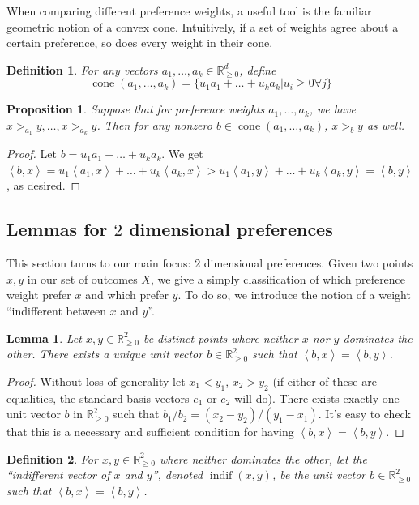 \documentclass[12pt]{article}
\newtheorem*{definition}{Definition}
\newtheorem{proposition}[theorem]{Proposition}
\newtheorem{lemma}[theorem]{Lemma}
\newcommand{\Rgz}{\mathbb{R}_{\ge 0}}
\newcommand{\ip}[2]{\left\langle{#1},{#2}\right\rangle}
\DeclareMathOperator*{\cone}{cone}
\DeclareMathOperator*{\indif}{indif}
\newcommand{\1}[1]{\mathds{1}[{#1}]}
\begin{document}

    When comparing different preference weights, a useful tool is
    the familiar geometric notion of a convex cone.
    Intuitively, if a set of weights agree about a certain preference,
    so does every weight in their cone.
    \begin{definition}
      For any vectors $a_1,\ldots, a_k \in \Rgz^d$, define
      \[ \cone(a_1,\ldots,a_k) = \{ u_1a_1 + \ldots + u_ka_k | u_i\ge 0 \forall j\} \]
    \end{definition}
    \begin{proposition}\label{prop:conesAgreement}
      Suppose that for preference weights $a_1,\ldots, a_k$,
      we have $x >_{a_1} y, \ldots, x >_{a_k} y$.
      Then for any nonzero $b\in \cone(a_1,\ldots, a_k)$,
      $x >_b y$ as well.
    \end{proposition}
    \begin{proof}
      Let $b = u_1a_1+ \ldots + u_ka_k$.
      We get $\ip{b}{x} = u_1\ip{a_1}{x} + \ldots + u_k\ip{a_k}{x}
      > u_1\ip{a_1}{y} + \ldots + u_k\ip{a_k}{y} = \ip{b}{y}$,
      as desired.
    \end{proof}

  \subsection{Lemmas for $2$ dimensional preferences}

    This section turns to our main focus: $2$ dimensional preferences.
    Given two points $x,y$ in our set of outcomes $X$, we give a simply
    classification of which preference weight prefer $x$ and which prefer $y$.
    To do so, we introduce the notion of a weight ``indifferent between $x$ and $y$''.
    \begin{lemma}
      Let $x,y\in \Rgz^2$ be distinct points where neither 
      $x$ nor $y$ dominates the other.
      There exists a unique unit vector $b\in\Rgz^2$ such that
      $\ip{b}{x} = \ip{b}{y}$.
    \end{lemma}
    \begin{proof}
      Without loss of generality let $x_1 < y_1$, $x_2 > y_2$
      (if either of these are equalities, the standard basis vectors
      $e_1$ or $e_2$ will do).
      There exists exactly one unit vector $b$ in $\Rgz^2$ such that
      $b_1 / b_2 = (x_2 - y_2) / (y_1 - x_1)$.
      It's easy to check that this is a necessary and sufficient 
      condition for having $\ip{b}{x} = \ip{b}{y}$.
    \end{proof}
    \begin{definition}
      For $x,y\in \Rgz^2$ where neither dominates the other,
      let the ``indifferent vector of $x$ and $y$'',
      denoted $\indif(x,y)$, be the unit vector $b\in\Rgz^2$ such 
      that $\ip{b}{x} = \ip{b}{y}$.
    \end{definition}
\end{document}

